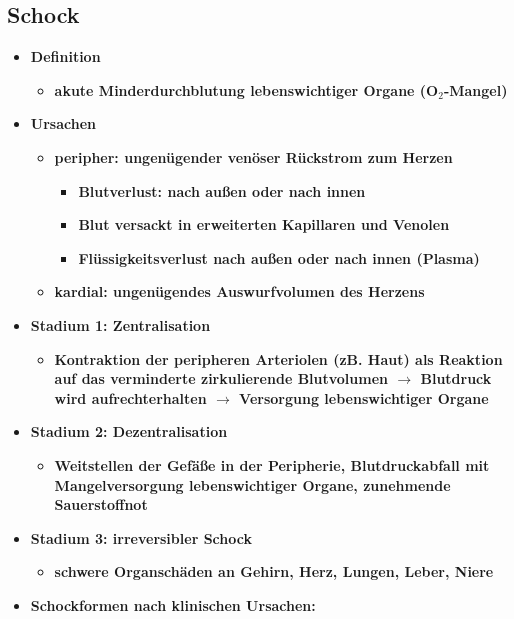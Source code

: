 	\subsection*{Schock}
		\begin{itemize}
			\item \textbf{Definition}
				\begin{itemize}
					\item \textbf{akute Minderdurchblutung lebenswichtiger Organe (O$_2$-Mangel)}
				\end{itemize}
			\item \textbf{Ursachen}
				\begin{itemize}
					\item \textbf{peripher: ungenügender venöser Rückstrom zum Herzen}
						\begin{itemize}
							\item \textbf{Blutverlust: nach außen oder nach innen}
							\item \textbf{Blut versackt in erweiterten Kapillaren und Venolen}
							\item \textbf{Flüssigkeitsverlust nach außen oder nach innen (Plasma)}
						\end{itemize}
					\item \textbf{kardial: ungenügendes Auswurfvolumen des Herzens}
				\end{itemize}
			\item \textbf{Stadium 1: Zentralisation}
				\begin{itemize}
					\item \textbf{Kontraktion der peripheren Arteriolen (zB. Haut) als Reaktion auf das verminderte zirkulierende Blutvolumen $\rightarrow$ Blutdruck wird aufrechterhalten $\rightarrow$ Versorgung lebenswichtiger Organe}
				\end{itemize}
			\item \textbf{Stadium 2: Dezentralisation}
				\begin{itemize}
					\item \textbf{Weitstellen der Gefäße in der Peripherie, Blutdruckabfall mit Mangelversorgung lebenswichtiger Organe, zunehmende Sauerstoffnot}
				\end{itemize}
			\item \textbf{Stadium 3: irreversibler Schock}
				\begin{itemize}
					\item \textbf{schwere Organschäden an Gehirn, Herz, Lungen, Leber, Niere}
				\end{itemize}
			\item \textbf{Schockformen nach klinischen Ursachen:}

\end{itemize}
